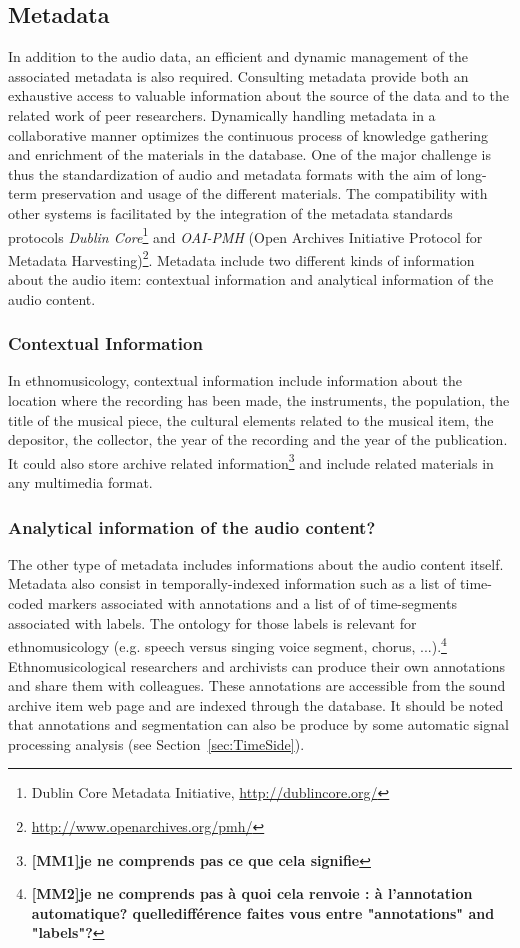 \documentclass{sig-alternate}
\newcommand{\comment}[1]{\footnote{\color{red} \bf{{#1}}}}
\begin{document}
\subsection{Metadata}\label{sec:metadata}
In addition to the audio data, an efficient and dynamic management of the associated metadata is also required. Consulting metadata provide both an exhaustive access to valuable information about the source of the data and to the related work of peer researchers. 
Dynamically handling metadata in a collaborative manner optimizes the continuous process of knowledge gathering and enrichment of the materials in the database.  
One of the major challenge is thus the standardization of audio and metadata formats with the aim of long-term preservation and usage of the different materials.
The compatibility with other systems is facilitated by the integration of the metadata standards protocols \emph{Dublin Core}\footnote{{Dublin Core} Metadata Initiative, \url{http://dublincore.org/}} and \emph{OAI-PMH} (Open Archives Initiative Protocol for Metadata Harvesting)\footnote{\url{http://www.openarchives.org/pmh/}}.
Metadata include two different kinds of information about the audio item: contextual information and analytical information of the audio content.
\subsubsection{Contextual Information}
In ethnomusicology, contextual information include information about the location where the recording has been made, the instruments, the population, the title of the musical piece, the cultural elements related to the musical item, the depositor, the collector, the year of the recording and the year of the publication. 
 It could also store archive related information\comment{[MM1]je ne comprends pas ce que cela signifie}
  and include related materials in any multimedia format.
\subsubsection{Analytical information of the audio content?}
The other type of metadata includes informations about the audio content itself.
Metadata also consist in temporally-indexed information such as a list of time-coded markers associated with annotations and a list of of time-segments associated with labels. The ontology for those labels is relevant for ethnomusicology (e.g. speech versus singing voice segment, chorus, ...).\comment{[MM2]je ne comprends pas à quoi cela renvoie : à l'annotation automatique?
quelledifférence faites vous entre "annotations" and "labels"?}
Ethnomusicological researchers and archivists can produce their own annotations and share them with colleagues. These annotations are accessible from the sound archive item web page and are indexed through the database.
It should be noted that annotations and segmentation can also be produce by some automatic signal processing analysis (see Section~\ref{sec:TimeSide}).
\end{document}
